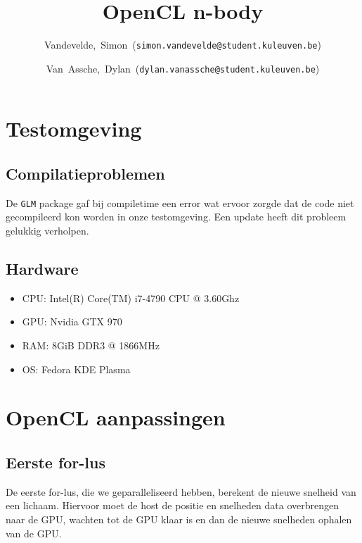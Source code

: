 \documentclass{article}
\title{OpenCL n-body}
\author{Vandevelde,~Simon~(\texttt{simon.vandevelde@student.kuleuven.be})
  \and
  Van~Assche,~Dylan~(\texttt{dylan.vanassche@student.kuleuven.be})}
\begin{document}
\maketitle %

\section{Testomgeving}
\subsection{Compilatieproblemen}

De \texttt{GLM} package gaf bij compiletime een error wat
ervoor zorgde dat de code niet gecompileerd kon worden in onze testomgeving. 
Een update heeft dit probleem gelukkig verholpen.

\subsection{Hardware}
\begin{itemize}
    \item CPU: Intel(R) Core(TM) i7-4790 CPU @ 3.60Ghz
    \item GPU: Nvidia GTX 970
    \item RAM: 8GiB DDR3 @ 1866MHz
    \item OS: Fedora KDE Plasma
\end{itemize}

\section{OpenCL aanpassingen}
\subsection{Eerste for-lus}
De eerste for-lus, die we geparalleliseerd hebben, berekent de nieuwe snelheid van een lichaam.
Hiervoor moet de host de positie en snelheden data overbrengen naar de GPU, wachten tot de GPU
klaar is en dan de nieuwe snelheden ophalen van de GPU.
\end{document}

